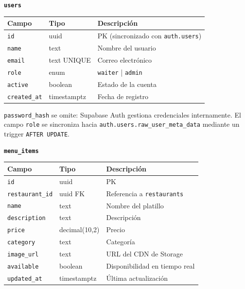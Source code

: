 \vspace{6pt}
\noindent\textbf{\texttt{users}}

\begin{tabular}{lll}
  \toprule
  \textbf{Campo} & \textbf{Tipo} & \textbf{Descripción} \\
  \midrule
  \texttt{id}         & uuid            & PK (sincronizado con \texttt{auth.users}) \\
  \texttt{name}       & text            & Nombre del usuario \\
  \texttt{email}      & text UNIQUE     & Correo electrónico \\
  \texttt{role}       & enum            & \texttt{waiter} | \texttt{admin} \\
  \texttt{active}     & boolean         & Estado de la cuenta \\
  \texttt{created\_at} & timestamptz    & Fecha de registro \\
  \bottomrule
\end{tabular}

\begin{notabox}
\texttt{password\_hash} se omite: Supabase Auth gestiona credenciales internamente.
El campo \texttt{role} se sincroniza hacia \texttt{auth.users.raw\_user\_meta\_data}
mediante un trigger \texttt{AFTER UPDATE}.
\end{notabox}

\vspace{6pt}
\noindent\textbf{\texttt{menu\_items}}

\begin{tabular}{lll}
  \toprule
  \textbf{Campo} & \textbf{Tipo} & \textbf{Descripción} \\
  \midrule
  \texttt{id}            & uuid          & PK \\
  \texttt{restaurant\_id} & uuid FK      & Referencia a \texttt{restaurants} \\
  \texttt{name}          & text          & Nombre del platillo \\
  \texttt{description}   & text          & Descripción \\
  \texttt{price}         & decimal(10,2) & Precio \\
  \texttt{category}      & text          & Categoría \\
  \texttt{image\_url}    & text          & URL del CDN de Storage \\
  \texttt{available}     & boolean       & Disponibilidad en tiempo real \\
  \texttt{updated\_at}   & timestamptz   & Última actualización \\
  \bottomrule
\end{tabular}

